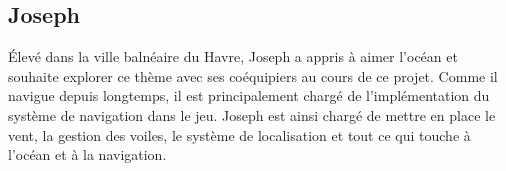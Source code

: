 \documentclass{article}
\begin{document}
\subsection{Joseph}\hfill

Élevé dans la ville balnéaire du Havre, Joseph a appris à aimer l'océan et souhaite explorer ce thème avec ses coéquipiers au cours de ce projet. Comme il navigue depuis longtemps, il est principalement chargé de l'implémentation du système de navigation dans le jeu. Joseph est ainsi chargé de mettre en place le vent, la gestion des voiles, le système de localisation et tout ce qui touche à l'océan et à la navigation.















\newpage
\end{document}
